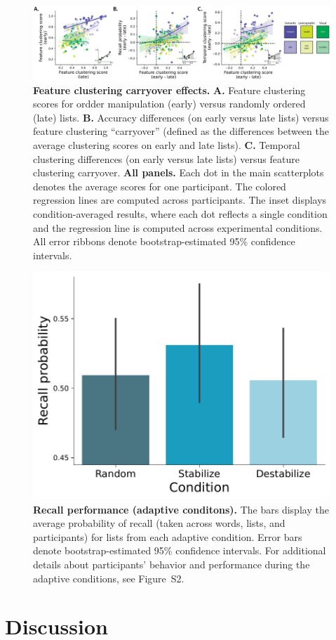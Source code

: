 \documentclass[11pt]{article}
\newcommand{\dynamicsAdaptive}{S2}
\begin{document}
\begin{figure}[tp] \centering
    \includegraphics[width=\textwidth]{figures/clustering_carryover}
    
    \caption{\textbf{Feature clustering carryover effects.} \textbf{A.} Feature clustering scores for ordder manipulation (early) versus randomly ordered (late) lists.
    \textbf{B.}  Accuracy differences (on early versus late lists) versus feature clustering ``carryover'' (defined as the differences between the average clustering scores on early and late lists).
    \textbf{C.}  Temporal clustering differences (on early versus late lists) versus feature clustering carryover.  \textbf{All panels.} Each dot in the main scatterplots denotes the
    average scores for one participant. The colored regression lines are computed
    across participants. The inset displays condition-averaged results, where each
    dot reflects a single condition and the regression line is computed across
    experimental conditions. All error ribbons denote bootstrap-estimated 95\%
    confidence intervals.} \label{fig:clustering-carryover}
    \end{figure}

\begin{figure} 
    \centering

    \includegraphics[width=0.4 \textwidth]{figures/source/accuracy_adaptive}
        
        \caption{\textbf{Recall performance (adaptive conditons).} The bars display the average probability of recall (taken across words, lists, and participants)
        for lists from each adaptive condition.  Error bars denote bootstrap-estimated 95\% confidence intervals.  For additional details about
        participants' behavior and performance during the adaptive conditions, see Figure~\dynamicsAdaptive.} 

    \label{fig:adaptive}
\end{figure}

\section*{Discussion}






\end{document}
